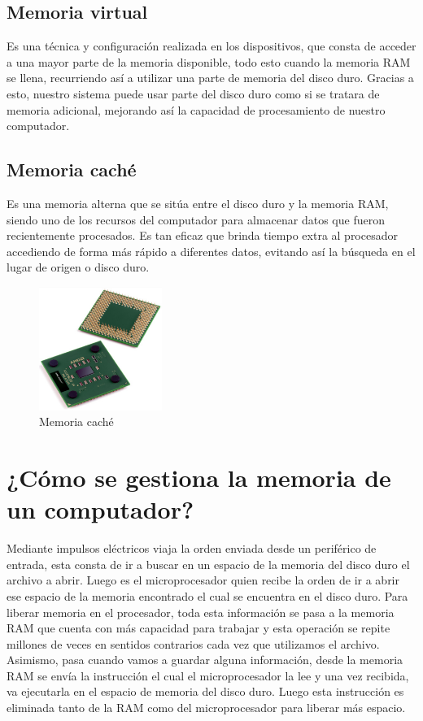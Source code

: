 \documentclass{article}
\begin{document}
\subsection{Memoria virtual}
Es una técnica y configuración realizada en los dispositivos, que consta de acceder a una mayor parte de la memoria disponible, todo esto cuando la memoria RAM se llena, recurriendo así a utilizar una parte de memoria del disco duro. Gracias a esto, nuestro sistema puede usar parte del disco duro como si se tratara de memoria adicional, mejorando así la capacidad de procesamiento de nuestro computador. \cite{memoriavirtual}

\subsection{Memoria caché}
Es una memoria alterna que se sitúa entre el disco duro y la memoria RAM, siendo uno de los recursos del computador para almacenar datos que fueron recientemente procesados. Es tan eficaz que brinda tiempo extra al procesador accediendo de forma más rápido a diferentes datos, evitando así la búsqueda en el lugar de origen o disco duro. \cite{velocidad}

\begin{figure}[h]
\includegraphics[width=4cm]{cache.PNG}
\centering
\caption{Memoria caché}
\end{figure}

\section{¿Cómo se gestiona la memoria de un computador?}
Mediante impulsos eléctricos viaja la orden enviada desde un periférico de entrada, esta consta de ir a buscar en un espacio de la memoria del disco duro el archivo a abrir. Luego es el microprocesador quien recibe la orden de ir a abrir ese espacio de la memoria encontrado el cual se encuentra en el disco duro. Para liberar memoria en el procesador, toda esta información se pasa a la memoria RAM que cuenta con más capacidad para trabajar y esta operación se repite millones de veces en sentidos contrarios cada vez que utilizamos el archivo. Asimismo, pasa cuando vamos a guardar alguna información, desde la memoria RAM se envía la instrucción el cual el microprocesador la lee y una vez recibida, va ejecutarla en el espacio de memoria del disco duro. Luego esta instrucción es eliminada tanto de la RAM como del microprocesador para liberar más espacio. \cite{gestion}
\end{document}
